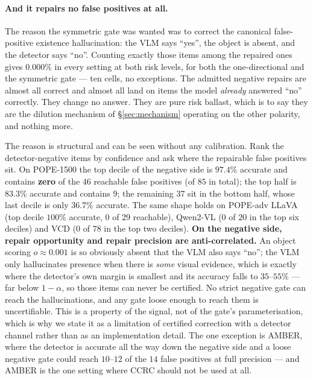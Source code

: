 \documentclass[review,number,doubleblind]{elsarticle}
\theoremstyle{plain}
\theoremstyle{definition}
\theoremstyle{remark}
\begin{document}
\paragraph{And it repairs no false positives at all.}
The reason the symmetric gate was wanted was to correct the canonical false-positive existence
hallucination: the VLM says ``yes'', the object is absent, and the detector says ``no''. Counting
exactly those items among the repaired ones gives $0.000\%$ in every setting at both risk
levels, for both the one-directional and the symmetric gate --- ten cells, no exceptions. The
admitted negative repairs are almost all correct and almost all land on items the model
\emph{already} answered ``no'' correctly. They change no answer. They are pure risk ballast,
which is to say they are the dilution mechanism of \S\ref{sec:mechanism} operating on the other
polarity, and nothing more.

The reason is structural and can be seen without any calibration. Rank the detector-negative
items by confidence and ask where the repairable false positives sit. On POPE-1500 the top
decile of the negative side is $97.4\%$ accurate and contains \textbf{zero} of the $46$ reachable
false positives (of $85$ in total); the top half is $83.3\%$ accurate and contains $9$; the
remaining $37$ sit in the bottom half, whose last decile is only $36.7\%$ accurate. The same
shape holds on POPE-adv LLaVA (top decile
$100\%$ accurate, $0$ of $29$ reachable), Qwen2-VL ($0$ of $20$ in the top six deciles) and VCD
($0$ of $78$ in the top two deciles). \textbf{On the negative side, repair opportunity and repair
precision are anti-correlated.} An object scoring $o\approx0.001$ is so obviously absent that the
VLM also says ``no''; the VLM only hallucinates presence when there is \emph{some} visual
evidence, which is exactly where the detector's own margin is smallest and its accuracy falls to
$35$--$55\%$ --- far below $1-\alpha$, so those items can never be certified. No strict negative
gate can reach the hallucinations, and any gate loose enough to reach them is uncertifiable. This
is a property of the signal, not of the gate's parameterisation, which is why we state it as a
limitation of certified correction with a detector channel rather than as an implementation
detail. The one exception is AMBER, where the detector is accurate all the way down the negative
side and a loose negative gate could reach $10$--$12$ of the $14$ false positives at full
precision --- and AMBER is the one setting where CCRC should not be used at all.
\end{document}
